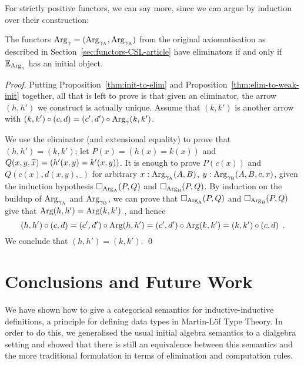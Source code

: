 \documentclass[orivec,envcountsame, ,envcountsect]{llncs}
\begin{document}
For strictly positive functors, we can say more, since we can argue by
induction over their construction:

\label{sec:elim-init-equiv-CSL}
\begin{theorem}
\label{thm:equiv-init-elim}
The functors $\text{Arg}_{\gamma} = (\text{Arg}_{\gamma_\text{A}}, \text{Arg}_{\gamma_\text{B}})$ from the original axiomatisation as
described in Section~\ref{sec:functors-CSL-article} have eliminators
if and only if $\mathbb{E}_{\text{Arg}_{\gamma}}$ has an initial object.
\end{theorem}
\begin{proof}
  Putting Proposition~\ref{thm:init-to-elim} and
  Proposition~\ref{thm:elim-to-weak-init} together, all that is left
  to prove is that given an eliminator, the arrow $(h, h')$ we
  construct is actually unique. Assume that $(k, k')$ is another arrow
  with $(k, k') \circ (c, d) = (c', d') \circ \text{Arg}_{\gamma}(k, k')$.

  We use the eliminator (and extensional equality) to prove that $(h, h') =
  (k ,k')$; let $P(x) = (h(x) = k(x))$ and $Q(x, y, \widetilde{x})
  = (h'(x, y) = k'(x, y))$. It is enough to prove $P(c(x))$ and
  $Q(c(x), d(x, y), \_)$ for arbitrary $x : \text{Arg}_{\gamma_\text{A}}(A, B)$, $y :
  \text{Arg}_{\gamma_\text{B}}(A, B, c, x)$, given the induction hypothesis $\Box_{\text{Arg}_{\text{A}}}(P,
  Q)$ and $\Box_{\text{Arg}_{\text{B}}}(P, Q)$.
By induction on the buildup of $\text{Arg}_{\gamma_\text{A}}$ and $\text{Arg}_{\gamma_\text{B}}$, we can prove that 
$\Box_{\text{Arg}_{\text{A}}}(P,  Q)$ and $\Box_{\text{Arg}_{\text{B}}}(P, Q)$ give that
$\text{Arg}(h, h') =  \text{Arg}(k, k')$ , and hence
  \[
  (h, h') \circ (c, d) = (c', d') \circ \text{Arg}(h, h')
                       = (c', d') \circ \text{Arg}(k, k')
                       = (k, k') \circ (c, d) \enspace .
  \]
  We conclude that $(h, h') =  (k ,k')$. \qed
\end{proof}
\section{Conclusions and Future Work}

We have shown how to give a categorical semantics for
inductive-inductive definitions, a principle for defining data types in
Martin-L\"of Type Theory. In order to do this, we generalised the
usual initial algebra semantics to a dialgebra setting and showed that
there is still an equivalence between this semantics and the more
traditional formulation in terms of elimination and computation rules.
\end{document}
